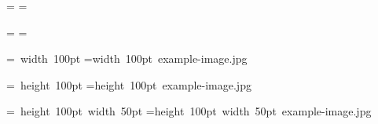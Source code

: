 


\ifhint
{}=\hbox{}
\else
{}=\hbox{\pdfrefximage\pdflastximage} 
\fi
\showthe{}
\showthe{}

\ifhint
{}=\hbox{}
\else
{}=\hbox{\pdfrefximage\pdflastximage}
\fi
\showthe{}
\showthe{}

\ifhint
{}=\hbox{ width 100pt}
\else
{}=\hbox{\pdfximage width 100pt {example-image.jpg}\pdfrefximage\pdflastximage}
\fi
\showthe{}
\showthe{}

\ifhint
{}=\hbox{ height 100pt}
\else
{}=\hbox{\pdfximage height 100pt {example-image.jpg}\pdfrefximage\pdflastximage}
\fi
\showthe{}
\showthe{}

\ifhint
{}=\hbox{ height 100pt width 50pt}
\else
{}=\hbox{\pdfximage height 100pt width 50pt {example-image.jpg}\pdfrefximage\pdflastximage}
\fi
\showthe{}
\showthe{}


\bye

